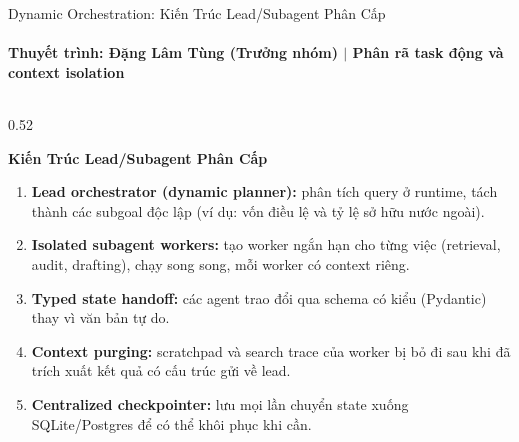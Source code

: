 \documentclass[aspectratio=1610,10pt,xcolor={table}]{beamer}
\begin{document}
\begin{frame}{Dynamic Orchestration: Kiến Trúc Lead/Subagent Phân Cấp}
  \framesubtitle{Thuyết trình: Đặng Lâm Tùng (Trưởng nhóm) $\vert$ Phân rã task động và context isolation}

  \begin{columns}[t]
    \begin{column}{0.52\textwidth}
      \begin{block}{\textbf{Kiến Trúc Lead/Subagent Phân Cấp}}
        \scriptsize
        \begin{enumerate}\scriptsize
          \item \textbf{Lead orchestrator (dynamic planner):}
                phân tích query ở runtime, tách thành các subgoal độc lập (ví dụ: vốn điều lệ và tỷ lệ sở hữu nước ngoài).
          \item \textbf{Isolated subagent workers:}
                tạo worker ngắn hạn cho từng việc (retrieval, audit, drafting), chạy song song, mỗi worker có context riêng.
          \item \textbf{Typed state handoff:}
                các agent trao đổi qua schema có kiểu (Pydantic) thay vì văn bản tự do.
          \item \textbf{Context purging:}
                scratchpad và search trace của worker bị bỏ đi sau khi đã trích xuất kết quả có cấu trúc gửi về lead.
          \item \textbf{Centralized checkpointer:}
                lưu mọi lần chuyển state xuống SQLite/Postgres để có thể khôi phục khi cần.
        \end{enumerate}
      \end{block}
    \end{column}


\end{columns}
\end{frame}
\end{document}

